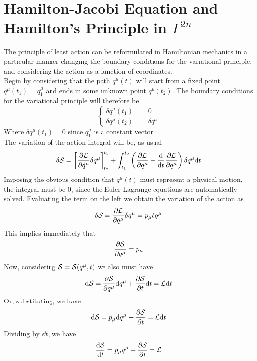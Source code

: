 \documentclass[../admech.tex]{subfiles}
\begin{document}
\section{Hamilton-Jacobi Equation and Hamilton's Principle in $\Gamma^{2n}$}
The principle of least action can be reformulated in Hamiltonian mechanics in a particular manner changing the boundary conditions for the variational principle, and considering the action as a function of coordinates.\\
Begin by considering that the path $q^\mu(t)$ will start from a fixed point $q^\mu(t_1)=q^\mu_1$ and ends in some unknown point $q^\mu(t_2)$. The boundary conditions for the variational principle will therefore be
\begin{equation*}
	\left\{ \begin{aligned}
			\delta q^\mu(t_1)&=0\\
			\delta q^\mu(t_2)&=\delta q^\mu
	\end{aligned}\right.
\end{equation*}
Where $\delta q^\mu(t_1)=0$ since $q^\mu_1$ is a constant vector.\\
The variation of the action integral will be, as usual
\begin{equation*}
	\delta\mathcal{S}=\left[ \pdv{\mathcal{L}}{\dot{q}^\mu}\delta q^\mu \right]^{t_1}_{t_2}+\int_{t_1}^{t_2}\left( \pdv{\mathcal{L}}{q^\mu}-\dv{t}\pdv{\mathcal{L}}{\dot{q}^\mu} \right)\delta q^\mu\dd t
\end{equation*}
Imposing the obvious condition that $q^\mu(t)$ must represent a physical motion, the integral must be 0, since the Euler-Lagrange equations are automatically solved. Evaluating the term on the left we obtain the variation of the action as
\begin{equation}
	\delta\mathcal{S}=\pdv{\mathcal{L}}{\dot{q}^\mu}\delta q^\mu=p_\mu\delta q^\mu
	\label{eq:actcoord1}
\end{equation}
This implies immediately that
\begin{equation*}
	\pdv{\mathcal{S}}{q^\mu}=p_\mu
\end{equation*}
Now, considering $\mathcal{S}=\mathcal{S}(q^\mu,t)$ we also must have
\begin{equation*}
	\dd\mathcal{S}=\pdv{\mathcal{S}}{q^\mu}\dd q^\mu+\pdv{\mathcal{S}}{t}\dd t=\mathcal{L}\dd t
\end{equation*}
Or, substituting, we have
\begin{equation*}
	\dd\mathcal{S}=p_\mu\dd q^\mu+\pdv{\mathcal{S}}{t}=\mathcal{L}\dd t
	\label{eq:difact}
\end{equation*}
Dividing by $\dd t$, we have
\begin{equation*}
	\dv{\mathcal{S}}{t}=p_\mu\dot{q}^\mu+\pdv{\mathcal{S}}{t}=\mathcal{L}
\end{equation*}
\end{document}
